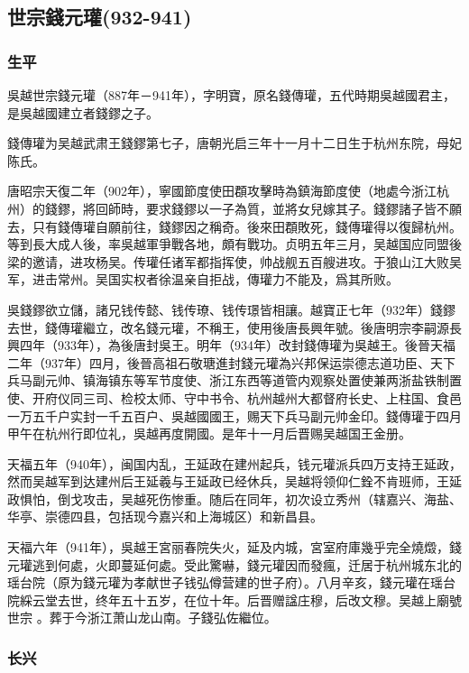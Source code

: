 
\subsection{世宗錢元瓘\tiny(932-941)}

\subsubsection{生平}

吳越世宗錢元瓘（887年－941年），字明寶，原名錢傳瓘，五代時期吳越國君主，是吳越國建立者錢鏐之子。

錢傳瓘为吴越武肃王錢鏐第七子，唐朝光启三年十一月十二日生于杭州东院，母妃陈氏。

唐昭宗天復二年（902年），寧國節度使田頵攻擊時為鎮海節度使（地處今浙江杭州）的錢鏐，將回師時，要求錢鏐以一子為質，並將女兒嫁其子。錢鏐諸子皆不願去，只有錢傳瓘自願前往，錢鏐因之稱奇。後來田頵敗死，錢傳瓘得以復歸杭州。等到長大成人後，率吳越軍爭戰各地，頗有戰功。贞明五年三月，吴越国应同盟後梁的邀请，进攻杨吴。传瓘任诸军都指挥使，帅战舰五百艘进攻。于狼山江大败吴军，进击常州。吴国实权者徐温亲自拒战，傳瓘力不能及，爲其所败。

吳錢鏐欲立儲，諸兄钱传懿、钱传璙、钱传璟皆相讓。越寶正七年（932年）錢鏐去世，錢傳瓘繼立，改名錢元瓘，不稱王，使用後唐長興年號。後唐明宗李嗣源長興四年（933年），為後唐封吳王。明年（934年）改封錢傳瓘为吳越王。後晉天福二年（937年）四月，後晉高祖石敬瑭進封錢元瓘為兴邦保运崇德志道功臣、天下兵马副元帅、镇海镇东等军节度使、浙江东西等道管内观察处置使兼两浙盐铁制置使、开府仪同三司、检校太师、守中书令、杭州越州大都督府长史、上柱国、食邑一万五千户实封一千五百户、吳越國國王，赐天下兵马副元帅金印。錢傳瓘于四月甲午在杭州行即位礼，吳越再度開國。是年十一月后晋赐吴越国王金册。

天福五年（940年），闽国内乱，王延政在建州起兵，钱元瓘派兵四万支持王延政，然而吴越军到达建州后王延羲与王延政已经休兵，吴越将领仰仁銓不肯班师，王延政惧怕，倒戈攻击，吴越死伤惨重。随后在同年，初次设立秀州（辖嘉兴、海盐、华亭、崇德四县，包括现今嘉兴和上海城区）和新昌县。

天福六年（941年），吳越王宮丽春院失火，延及内城，宮室府庫幾乎完全燒燬，錢元瓘逃到何處，火即蔓延何處。受此驚嚇，錢元瓘因而發瘋，迁居于杭州城东北的瑶台院（原为錢元瓘为孝献世子钱弘僔营建的世子府）。八月辛亥，錢元瓘在瑶台院綵云堂去世，终年五十五岁，在位十年。后晋赠諡庄穆，后改文穆。吴越上廟號世宗 。葬于今浙江萧山龙山南。子錢弘佐繼位。

\subsubsection{长兴}

